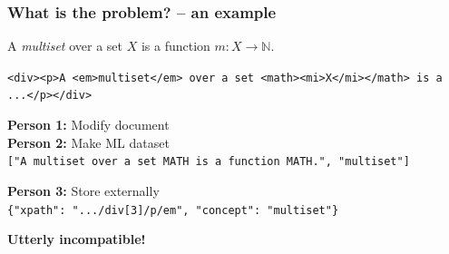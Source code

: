\documentclass[aspectratio=169]{beamer}
\begin{document}
\begin{frame}[fragile]
    \frametitle{What is the problem? -- an example}
    {\centering
        A \emph{multiset} over a set $X$ is a function $m: X \to \mathbb{N}$.\par
    }
    \vspace{0.5em}

    \verb|<div><p>A <em>multiset</em> over a set <math><mi>X</mi></math> is a ...</p></div>|

    \pause
    \vspace{1.0em}
        \textbf{Person 1:} Modify document\\
        

    \pause
    \vspace{0.5em}
        \textbf{Person 2:} Make ML dataset\\
        \verb|["A multiset over a set MATH is a function MATH.", "multiset"]|

    \pause
    \vspace{0.5em}
        \textbf{Person 3:} Store externally\\
        \verb|{"xpath": ".../div[3]/p/em", "concept": "multiset"}|

    \pause
    \vspace{1em}\centering
    \Large\bf Utterly incompatible!\par
\end{frame}
\end{document}
